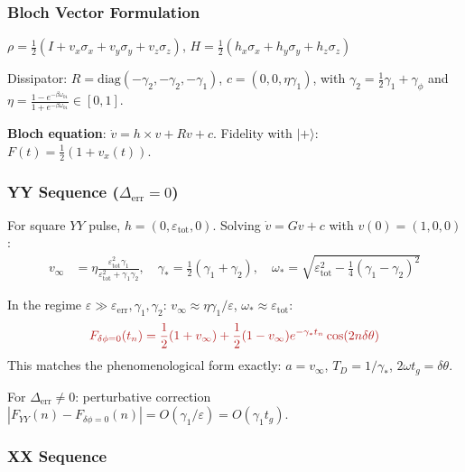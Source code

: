 \documentclass[10pt,a4paper]{article}
\begin{document}
\subsubsection{Bloch Vector Formulation}

$\rho = \frac{1}{2}(I + v_x\sigma_x + v_y\sigma_y + v_z\sigma_z)$, \; $H = \frac{1}{2}(h_x\sigma_x + h_y\sigma_y + h_z\sigma_z)$

Dissipator: $R = \mathrm{diag}(-\gamma_2, -\gamma_2, -\gamma_1)$, $c = (0,0,\eta\gamma_1)$, with $\gamma_2 = \frac{1}{2}\gamma_1 + \gamma_\phi$ and $\eta = \frac{1 - e^{-\beta\omega_{01}}}{1 + e^{-\beta\omega_{01}}} \in [0,1]$.

\textbf{Bloch equation}: $\dot{v} = h \times v + Rv + c$. \quad Fidelity with $|+\rangle$: $F(t) = \frac{1}{2}(1 + v_x(t))$.

\subsubsection{\texorpdfstring{YY Sequence ($\Delta_{\mathrm{err}} = 0$)}{YY Sequence (Delta\_err = 0)}}

For square $YY$ pulse, $h = (0, \varepsilon_{\mathrm{tot}}, 0)$. Solving $\dot{v} = Gv + c$ with $v(0) = (1,0,0)$:
\begin{align}
  v_\infty &= \eta\frac{\varepsilon_{\mathrm{tot}}^2\gamma_1}{\varepsilon_{\mathrm{tot}}^2 + \gamma_1\gamma_2}, \quad \gamma_* = \frac{1}{2}(\gamma_1 + \gamma_2), \quad \omega_* = \sqrt{\varepsilon_{\mathrm{tot}}^2 - \frac{1}{4}(\gamma_1 - \gamma_2)^2}
\end{align}

In the regime $\varepsilon \gg \varepsilon_{\mathrm{err}}, \gamma_1, \gamma_2$: $v_\infty \approx \eta\gamma_1/\varepsilon$, $\omega_* \approx \varepsilon_{\mathrm{tot}}$:
\begin{equation}
  \textcolor{alertred}{F_{\delta\phi=0}(t_n) = \frac{1}{2}(1+v_\infty) + \frac{1}{2}(1-v_\infty)e^{-\gamma_* t_n}\cos(2n\delta\theta)}
\end{equation}
This matches the phenomenological form exactly: $a = v_\infty$, $T_D = 1/\gamma_*$, $2\omega t_g = \delta\theta$.

For $\Delta_{\mathrm{err}} \neq 0$: perturbative correction $|F_{YY}(n) - F_{\delta\phi=0}(n)| = O(\gamma_1/\varepsilon) = O(\gamma_1 t_g)$.

\subsubsection{XX Sequence}
\end{document}
